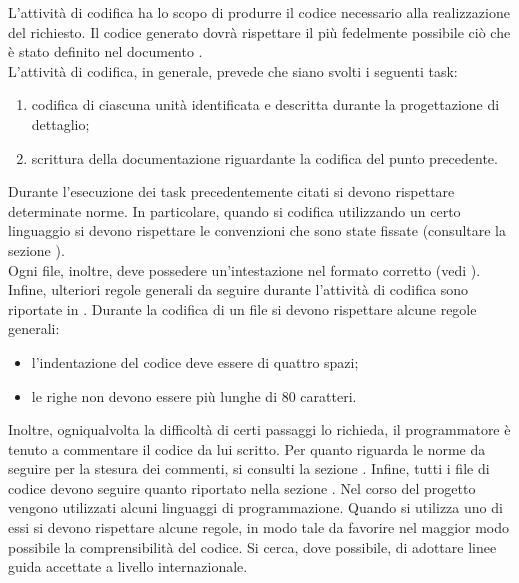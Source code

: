 	 \label{sec:codifica}
		L'attività di codifica ha lo scopo di produrre il codice necessario alla realizzazione del  richiesto. Il codice generato dovrà rispettare il più fedelmente possibile ciò che è stato definito nel documento .\\
		L'attività di codifica, in generale, prevede che siano svolti i seguenti task:
		\begin{enumerate}
			\item codifica di ciascuna unità identificata e descritta durante la progettazione di dettaglio;
			\item scrittura della documentazione riguardante la codifica del punto precedente.
		\end{enumerate}
		Durante l'esecuzione dei task precedentemente citati si devono rispettare determinate norme. In particolare, quando si codifica utilizzando un certo linguaggio si devono rispettare le convenzioni che sono state fissate (consultare la sezione ).\\
		Ogni file, inoltre, deve possedere un'intestazione nel formato corretto (vedi ).\\
		Infine, ulteriori regole generali da seguire durante l'attività di codifica sono riportate in .
			 \label{sec:CodificaNormeGenerali}
				Durante la codifica di un file si devono rispettare alcune regole generali:
				\begin{itemize}
					\item l'indentazione del codice deve essere di quattro spazi;
					\item le righe non devono essere più lunghe di 80 caratteri.
				\end{itemize}
				Inoltre, ogniqualvolta la difficoltà di certi passaggi lo richieda, il programmatore è tenuto a commentare il codice da lui scritto. Per quanto riguarda le norme da seguire per la stesura dei commenti, si consulti la sezione . 
				Infine, tutti i file di codice devono seguire quanto riportato nella sezione .
			 \label{sec:LineeGuida}
				Nel corso del progetto vengono utilizzati alcuni linguaggi di programmazione. Quando si utilizza uno di essi si devono rispettare alcune regole, in modo tale da favorire nel maggior modo possibile la comprensibilità del codice. Si cerca, dove possibile, di adottare linee guida accettate a livello internazionale.\\
